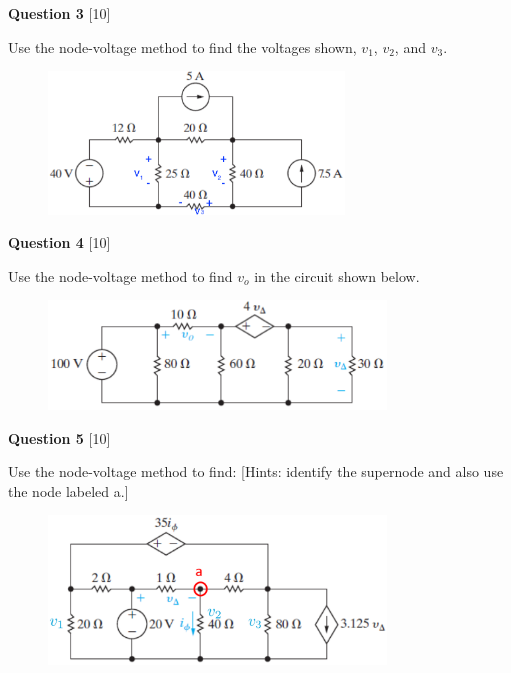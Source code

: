 \documentclass[12pt]{article}
\begin{document}
\noindent
{\bf Question 3} [10]

Use the node-voltage method to find the voltages shown, $v_{1}$, $v_{2}$, and $v_{3}$.
\begin{figure}[h!]
  \centering 
  \includegraphics[clip,width=0.7\textwidth]{Fig4-15.png}
\end{figure}

\newpage
\noindent
{\bf Question 4} [10]

Use the node-voltage method to find $v_{o}$ in the circuit shown below.

\vspace{0.1in}
\begin{figure}[h]
  \centering 
  \includegraphics[clip,width=0.8\textwidth]{Fig4-28.png}
\end{figure}

\vspace{0.1in}
\noindent
{\bf Question 5} [10]

Use the node-voltage method to find: [Hints: identify the supernode and also use the node labeled {\color{red} a}.]
\begin{figure}[h!]
\centering 
\includegraphics[clip,width=0.8\textwidth]{Fig4-29.png}
\end{figure}
\end{document}
